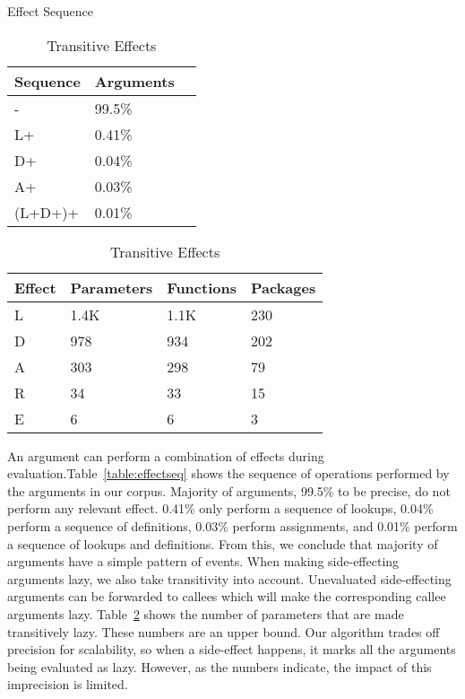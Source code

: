 \documentclass[review,nonacm,screen,acmsmall,anonymous=true]{acmart}
\begin{document}
\begin{table}
  \small
  \begin{minipage}{.3\linewidth}
  \centering
  \caption{Effect Sequence} \label{table:effectseq}
  \begin{tabular}{lll}
    \toprule
    \textbf{Sequence}&\textbf{Arguments}\\
    \midrule
    -&99.5\%\\
    L+&0.41\%\\
    D+&0.04\%\\
    A+&0.03\%\\
    (L+D+)+&0.01\%\\
    \bottomrule
  \end{tabular}
  \end{minipage}%
  \begin{minipage}{.6\linewidth}
  \centering
  \caption{Transitive Effects} \label{table:transeffects}
  \begin{tabular}{llll}
    \toprule
    \textbf{Effect}&\textbf{Parameters}&\textbf{Functions}&\textbf{Packages}\\
    \midrule
    L&1.4K&1.1K&230\\
    D&978&934&202\\
    A&303&298&79\\
    R&34&33&15\\
    E&6&6&3\\
    \bottomrule
  \end{tabular}
  \end{minipage}
\end{table}

An argument can perform a combination of effects during
evaluation.Table~\ref{table:effectseq} shows the sequence of operations
performed by the arguments in our corpus. Majority of arguments, 99.5\% to be
precise, do not perform any relevant effect. 0.41\% only perform a sequence of
lookups, 0.04\% perform a sequence of definitions, 0.03\% perform assignments,
and 0.01\% perform a sequence of lookups and definitions. From this, we conclude
that majority of arguments have a simple pattern of events.
%
When making side-effecting arguments lazy, we also take transitivity into
account. Unevaluated side-effecting arguments can be forwarded to callees which
will make the corresponding callee arguments lazy.
Table~\ref{table:transeffects} shows the number of parameters that are made
transitively lazy. These numbers are an upper bound. Our algorithm trades off
precision for scalability, so when a side-effect happens, it marks all the
arguments being evaluated as lazy. However, as the numbers indicate, the impact
of this imprecision is limited.
\end{document}
